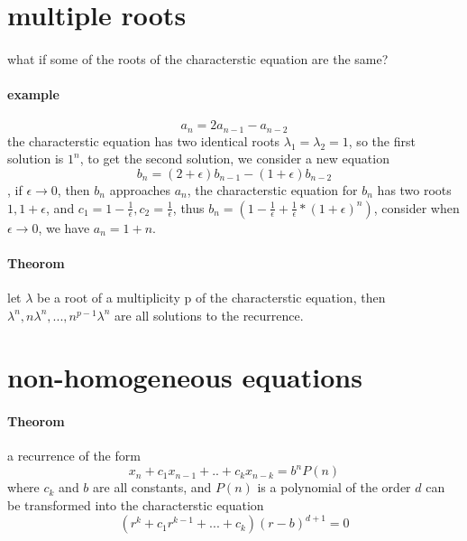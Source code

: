 \documentclass{article}
\begin{document}
\section{multiple roots}
  \paragraph{}
    what if some of the roots of the characterstic equation are the same?
  \paragraph{example}
  \begin{equation}
    a_n = 2a_{n - 1} - a_{n - 2}
  \end{equation}
  the characterstic equation has two identical roots $\lambda_1 = \lambda_2 = 1$, so the first solution is $1^n$, to get the second solution, we consider a new equation
  \begin{equation}
    b_n = (2 + \epsilon)b_{n - 1} - (1 + \epsilon)b_{n - 2}
  \end{equation},
  if $\epsilon \to 0$, then $b_n$ approaches $a_n$, the characterstic equation for $b_n$ has two roots $1, 1 + \epsilon$, and $c_1 = 1 - \frac{1}{\epsilon}, c_2 = \frac{1}{\epsilon}$,
  thus $b_n = (1 - \frac{1}{\epsilon} + \frac{1}{\epsilon}*(1 + \epsilon)^n)$, consider when $\epsilon \to 0$, we have $a_n = 1 + n$.
  \paragraph{Theorom}
    let $\lambda$ be a root of a multiplicity p of the characterstic equation, then $\lambda^n, n\lambda^n, ..., n^{p - 1}\lambda^n$ are all solutions to the recurrence.
\section{non-homogeneous equations}
  \paragraph{Theorom}
    a recurrence of the form
    \begin{equation}
      x_n + c_1x_{n - 1} + ..+c_kx_{n - k} = b^nP(n)
    \end{equation}
    where $c_k$ and $b$ are all constants, and $P(n)$ is a polynomial of the order $d$ can be transformed into the characterstic equation
    \begin{equation}
      (r^k + c_1r^{k - 1} + ... + c_k)(r - b)^{d + 1} = 0
    \end{equation}
\end{document}
